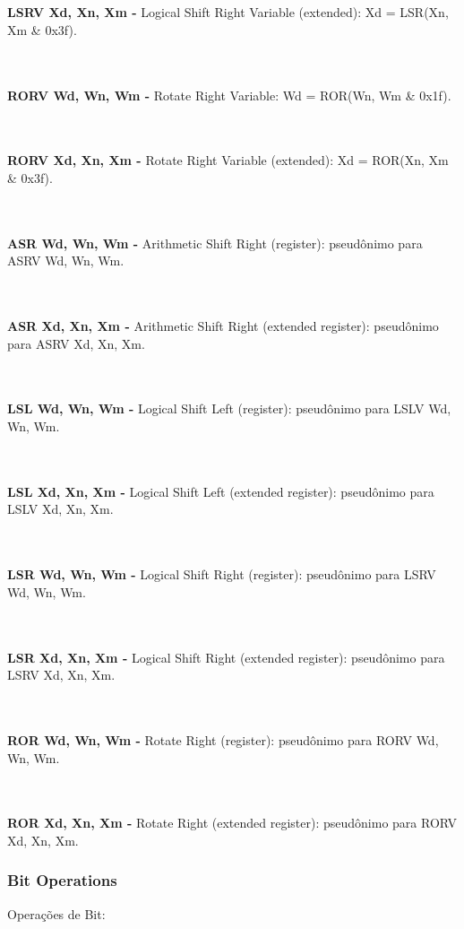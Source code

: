 \documentclass[12pt,a4paper,utf8]{ppgsi}
\begin{document}
\\\\\textbf{LSRV Xd, Xn, Xm -} Logical Shift Right Variable (extended): Xd = LSR(Xn, Xm \& 0x3f). 

\\\\\textbf{RORV Wd, Wn, Wm -} Rotate Right Variable: Wd = ROR(Wn, Wm \& 0x1f). 

\\\\\textbf{RORV Xd, Xn, Xm -} Rotate Right Variable (extended): Xd = ROR(Xn, Xm \& 0x3f). 

\\\\\textbf{ASR Wd, Wn, Wm -} Arithmetic Shift Right (register): pseudônimo para ASRV Wd, Wn, Wm. 

\\\\\textbf{ASR Xd, Xn, Xm -} Arithmetic Shift Right (extended register): pseudônimo para ASRV Xd, Xn, Xm. 

\\\\\textbf{LSL Wd, Wn, Wm -} Logical Shift Left (register): pseudônimo para LSLV Wd, Wn, Wm. 

\\\\\textbf{LSL Xd, Xn, Xm -} Logical Shift Left (extended register): pseudônimo para LSLV Xd, Xn, Xm. 

\\\\\textbf{LSR Wd, Wn, Wm -} Logical Shift Right (register): pseudônimo para LSRV Wd, Wn, Wm. 

\\\\\textbf{LSR Xd, Xn, Xm -} Logical Shift Right (extended register): pseudônimo para LSRV Xd, Xn, Xm.

\\\\\textbf{ROR Wd, Wn, Wm -} Rotate Right (register): pseudônimo para RORV Wd, Wn, Wm. 

\\\\\textbf{ROR Xd, Xn, Xm -} Rotate Right (extended register): pseudônimo para RORV Xd, Xn, Xm. 


\subsubsection{Bit Operations}
Operações de Bit:
\end{document}
